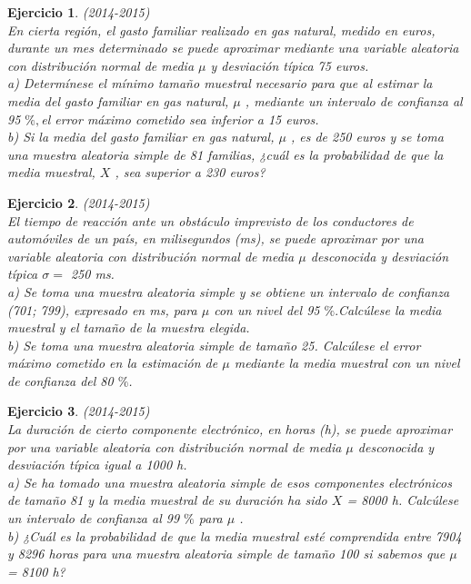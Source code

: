 \documentclass[12pt, a4paper]{amsart}
\newtheorem{ejer}{Ejercicio}
\begin{document}
\begin{ejer}\em (2014-2015)\\
En cierta región, el gasto familiar realizado en gas natural, medido en euros, durante un mes determinado se
puede aproximar mediante una variable aleatoria con distribución normal de media $\mu$ y desviación típica 75
euros.\\
a) Determínese el mínimo tamaño muestral necesario para que al estimar la media del gasto familiar en gas
natural, $\mu$ , mediante un intervalo de confianza al 95 $\%,$el error máximo cometido sea inferior a 15 euros.\\
b) Si la media del gasto familiar en gas natural, $\mu$ , es de 250 euros y se toma una muestra aleatoria simple de
81 familias, ¿cuál es la probabilidad de que la media muestral, $X$ , sea superior a 230 euros?
\end{ejer}

\begin{ejer}\em (2014-2015)\\
El tiempo de reacción ante un obstáculo imprevisto de los conductores de automóviles de un país, en
milisegundos (ms), se puede aproximar por una variable aleatoria con distribución normal de media  $\mu$
desconocida y desviación típica  $\sigma =$ 250 ms.\\
a) Se toma una muestra aleatoria simple y se obtiene un intervalo de confianza (701; 799), expresado en ms,
para $\mu$ con un nivel del 95 $\%.$Calcúlese la media muestral y el tamaño de la muestra elegida.\\
b) Se toma una muestra aleatoria simple de tamaño 25. Calcúlese el error máximo cometido en la estimación
de $\mu$ mediante la media muestral con un nivel de confianza del 80 $\%$. 
\end{ejer}

\begin{ejer}\em (2014-2015)\\
La duración de cierto componente electrónico, en horas (h), se puede aproximar por una variable aleatoria con
distribución normal de media $\mu$ desconocida y desviación típica igual a 1000 h.\\
a) Se ha tomado una muestra aleatoria simple de esos componentes electrónicos de tamaño 81 y la media
muestral de su duración ha sido $X$ = 8000 h. Calcúlese un intervalo de confianza al 99 $\%$ para $\mu$ .\\
b) ¿Cuál es la probabilidad de que la media muestral esté comprendida entre 7904 y 8296 horas para una
muestra aleatoria simple de tamaño 100 si sabemos que $\mu$ = 8100 h?
\end{ejer}
\end{document}
